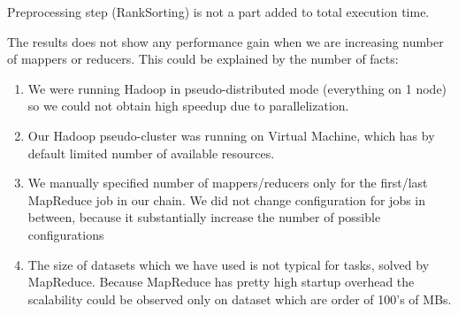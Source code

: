 \documentclass[a4paper]{article}
\begin{document}
Preprocessing step (RankSorting) is not a part added to total execution time.

The results does not show any performance gain when we are increasing number of mappers or reducers.
This could be explained by the number of facts:
\begin{enumerate}
    \item We were running Hadoop in pseudo-distributed mode (everything on 1 node) so we could not obtain high speedup due to parallelization.
    \item Our Hadoop pseudo-cluster was running on Virtual Machine, which has by default limited number of available resources.
    \item We manually specified number of mappers/reducers only for the first/last MapReduce job in our chain. We did not change configuration for jobs in between, because it substantially increase the number of possible configurations
    \item The size of datasets which we have used is not typical for tasks, solved by MapReduce. Because MapReduce has pretty high startup overhead the scalability could be observed only on dataset which are order of 100's of MBs.
\end{enumerate}
\end{document}
